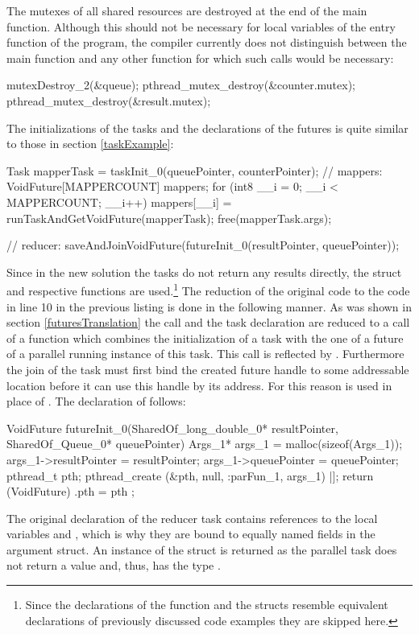 The mutexes of all shared resources are destroyed at the end of the main function. Although this should not be necessary for local variables of the entry function of the program, the compiler currently does not distinguish between the main function and any other function for which such calls would be necessary:
\begin{ccode}
mutexDestroy_2(&queue); 
pthread_mutex_destroy(&counter.mutex); 
pthread_mutex_destroy(&result.mutex);
\end{ccode}
The initializations of the tasks and the declarations of the futures is quite similar to those in section \ref{taskExample}:
\begin{ccode}
Task mapperTask = taskInit_0(queuePointer, counterPointer);
// mappers:
VoidFuture[MAPPERCOUNT] mappers; 
for (int8 __i = 0; __i < MAPPERCOUNT; __i++) { 
  mappers[__i] = runTaskAndGetVoidFuture(mapperTask); 
}
free(mapperTask.args);

// reducer:
saveAndJoinVoidFuture(futureInit_0(resultPointer, queuePointer));
\end{ccode}

Since in the new solution the tasks do not return any results directly, the  struct and respective functions are used.\footnote{Since the declarations of the  function and the  structs resemble equivalent declarations of previously discussed code examples they are skipped here.} The reduction of the original code  to the code in line 10 in the previous listing is done in the following manner. As was shown in section \ref{futuresTranslation} the  call and the task declaration are reduced to a call of a function which combines the initialization of a task with the one of a future of a parallel running instance of this task. This call is reflected by . Furthermore the join of the task must first bind the created future handle to some addressable location before it can use this handle by its address. For this reason  is used in place of . The declaration of  follows:
\begin{ccode}
VoidFuture futureInit_0(SharedOf_long_double_0* resultPointer, SharedOf_Queue_0* queuePointer) { 
  Args_1* args_1 = malloc(sizeof(Args_1)); 
  args_1->resultPointer = resultPointer; 
  args_1->queuePointer = queuePointer; 
  pthread_t pth; 
  pthread_create (&pth, null, :parFun_1, args_1) |]; 
  return (VoidFuture){ .pth = pth }; 
}
\end{ccode}
The original declaration of the reducer task contains references to the local variables  and , which is why they are bound to equally named fields in the argument struct. An instance of the  struct is returned as the parallel task does not return a value and, thus, has the type .

